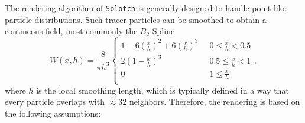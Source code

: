 The rendering algorithm of {\tt Splotch} is generally designed to handle
point-like particle distributions. Such tracer particles can be smoothed
to obtain a contineous field, most commonly the $B_2$-Spline \citep{1985A&A...149..135M}
\begin{equation}
   W(x,h)=\frac{8}{\pi h^3}\left\{\begin{array}{ll}
      1 - 6 \left(\frac{x}{h}\right)^2 + 6 \left(\frac{x}{h}\right)^3 \;\;& 0 \le \frac{x}{h} < 0.5 \\
      2 \left(1 - \frac{x}{h}\right)^3                              & 0.5 \le \frac{x}{h} < 1 \\
      0                                                             & 1 \le \frac{x}{h} \\
   \end{array} \right. , \label{SPH:kern}
\end{equation}
where $h$ is the local smoothing length, which is typically defined in a way
that every particle overlaps with $\approx 32$ neighbors. Therefore, the rendering is
based on the following assumptions:

